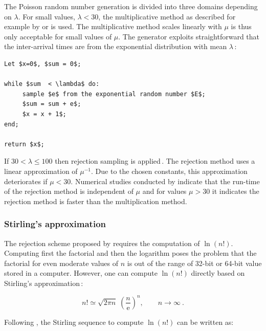 \documentclass[a4paper]{scrartcl}
\begin{document}
The Poisson random number generation is divided into three domains depending on $\lambda$. For small values, $\lambda < 30$, the multiplicative method as described for example by \citet{Knuth1997b} or \citet{Devroye1986} is used. The multiplicative method scales linearly with $\mu$ is thus only acceptable for small values of $\mu$. The generator exploits straightforward that the inter-arrival times are from the exponential distribution with mean $\lambda$\,\citep{Knuth1997b, Devroye1986}:\vspace{9mm}

{
\begin{lstlisting}[caption={Multiplicative method to sample from a Poisson distribution\,\citep{Devroye1986}.}, label=alg:poisson_multiply_method]
Let $x=0$, $sum = 0$;

while $sum  < \lambda$ do:
     sample $e$ from the exponential random number $E$;   
     $sum = sum + e$;
     $x = x + 1$;
end; 

return $x$;
\end{lstlisting}
}

If $30 < \lambda \leq100$ then rejection sampling is applied\,\citep{Atkinson1979}. The rejection method uses a linear approximation of $\mu^{-1}$. Due to the chosen constants, this approximation deteriorates if $\mu < 30$. Numerical studies conducted by \citet{Atkinson1979} indicate that the run-time of the rejection method is independent of $\mu$ and for values $\mu > 30$ it indicates the rejection method is faster than the multiplication method.

\subsubsection*{Stirling's approximation}
The rejection scheme proposed by \citet{Atkinson1979} requires the computation of $\ln(n!)$. Computing first the factorial and then the logarithm poses the problem that the factorial for even moderate values of $n$ is out of the range of 32-bit or 64-bit value stored in a computer. However, one can compute $\ln(n!)$ directly based on Stirling's approximation\,\cite{Knuth1997a}:

\begin{equation*}
n! \simeq \sqrt{2 \pi n} \; \left(\frac{n}{\mathrm e}\right)^{n},\qquad n\to\infty~.
\end{equation*}

Following \citet{Knuth1997a}, the Stirling sequence to compute $\ln (n!)$ can be written as:
\end{document}
